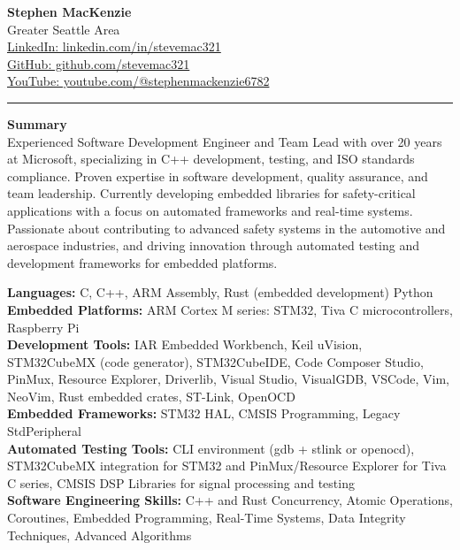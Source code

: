 \documentclass[a4paper,10pt]{article}
\begin{document}
\begin{center}
    \textbf{\Huge Stephen MacKenzie} \\
    Greater Seattle Area \\
    \href{https://www.linkedin.com/in/stevemac321/}{LinkedIn: linkedin.com/in/stevemac321} \\
    \href{https://github.com/stevemac321}{GitHub: github.com/stevemac321} \\
    \href{https://www.youtube.com/@stephenmackenzie6782}{YouTube: youtube.com/@stephenmackenzie6782} \\
\end{center}

\hrule
\vspace{1em}

\textbf{Summary} \\
Experienced Software Development Engineer and Team Lead with over 20 years at Microsoft, specializing in C++ development, testing, and ISO standards compliance. Proven expertise in software development, quality assurance, and team leadership. Currently developing embedded libraries for safety-critical applications with a focus on automated frameworks and real-time systems. Passionate about contributing to advanced safety systems in the automotive and aerospace industries, and driving innovation through automated testing and development frameworks for embedded platforms.

\textbf{Languages:} C, C++, ARM Assembly, Rust (embedded development)  Python \\
\textbf{Embedded Platforms:} ARM Cortex M series: STM32, Tiva C microcontrollers, Raspberry Pi \\
\textbf{Development Tools:} IAR Embedded Workbench, Keil uVision, STM32CubeMX (code generator), STM32CubeIDE, Code Composer Studio, PinMux, Resource Explorer, Driverlib, Visual Studio, VisualGDB, VSCode, Vim, NeoVim, Rust embedded crates, ST-Link, OpenOCD \\
\textbf{Embedded Frameworks:} STM32 HAL, CMSIS Programming, Legacy StdPeripheral \\
\textbf{Automated Testing Tools:} CLI environment (gdb + stlink or openocd), STM32CubeMX integration for STM32 and PinMux/Resource Explorer for Tiva C series, CMSIS DSP Libraries for signal processing and testing \\
\textbf{Software Engineering Skills:} C++ and Rust Concurrency, Atomic Operations, Coroutines, Embedded Programming, Real-Time Systems, Data Integrity Techniques, Advanced Algorithms
\end{document}
